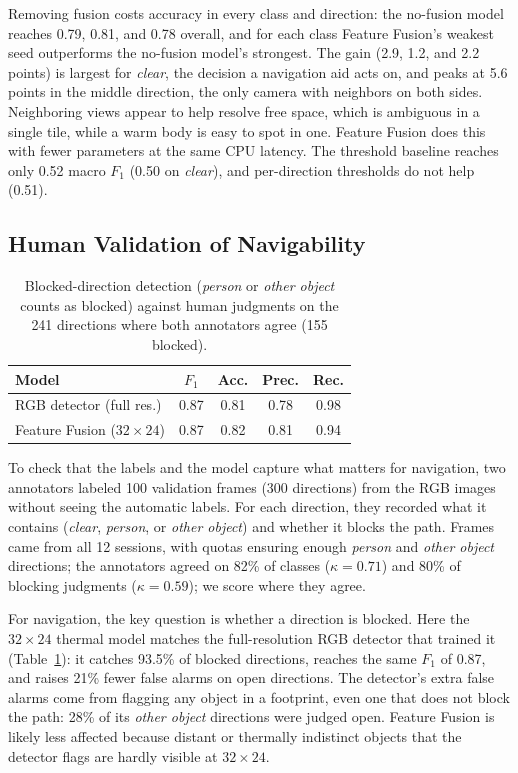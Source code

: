 Removing fusion costs accuracy in every class and direction: the no-fusion
model reaches 0.79, 0.81, and 0.78 overall, and for each class Feature
Fusion's weakest seed outperforms the no-fusion model's strongest. The gain (2.9, 1.2, and 2.2
points) is largest for \textit{clear}, the decision a navigation aid acts on,
and peaks at 5.6 points in the middle direction, the only camera with
neighbors on both sides. Neighboring views appear to help resolve free space,
which is ambiguous in a single tile, while a warm body is easy to spot in one.
Feature Fusion does this with fewer parameters at the same CPU latency. The threshold baseline reaches only 0.52 macro $F_1$ (0.50 on
\textit{clear}), and per-direction thresholds do not help (0.51).

\subsection{Human Validation of Navigability}
\begin{table}[t]
\centering
\caption{Blocked-direction detection (\textit{person} or \textit{other
object} counts as blocked) against human judgments on the 241 directions where
both annotators agree (155 blocked).}
\label{tab:human_val}
\footnotesize
\setlength{\tabcolsep}{5pt}
\begin{tabular}{@{}lcccc@{}}
\toprule
\textbf{Model} & \textbf{$F_1$} & \textbf{Acc.} & \textbf{Prec.} & \textbf{Rec.} \\
\midrule
RGB detector (full res.) & 0.87 & 0.81 & 0.78 & 0.98 \\
Feature Fusion ($32\times24$) & 0.87 & 0.82 & 0.81 & 0.94 \\
\bottomrule
\end{tabular}
\end{table}

To check that the labels and the model capture what matters for navigation,
two annotators labeled 100 validation frames (300 directions) from the RGB
images without seeing the automatic labels. For each direction, they recorded
what it contains (\textit{clear}, \textit{person}, or \textit{other object})
and whether it blocks the path. Frames came from all 12 sessions, with quotas
ensuring enough \textit{person} and \textit{other object} directions; the
annotators agreed on 82\% of classes ($\kappa = 0.71$) and 80\% of blocking
judgments ($\kappa = 0.59$); we score where they agree.

For navigation, the key question is whether a direction is blocked. Here the
$32\times24$ thermal model matches the full-resolution RGB detector that
trained it (Table~\ref{tab:human_val}): it catches 93.5\% of blocked
directions, reaches the same $F_1$ of 0.87, and raises 21\% fewer false
alarms on open directions. The detector's extra false alarms come from
flagging any object in a footprint, even one that does not block the path:
28\% of its \textit{other object} directions were judged open. Feature
Fusion is likely less affected because distant or thermally indistinct objects
that the detector flags are hardly visible at $32\times24$.


